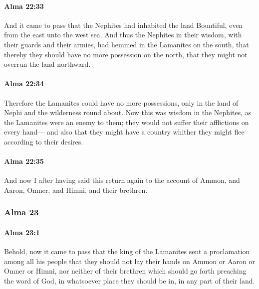 		\paragraph{Alma 22:33} %
			\label{ALMA-22-33}

			And it came to pass that the Nephites had inhabited the land Bountiful,
			even from the east unto the west sea.
			And thus the Nephites in their wisdom, with their guards and their armies,
			had hemmed in the Lamanites on the south,
			that thereby they should have no more possession on the north,
			that they might not overrun the land northward.

		\paragraph{Alma 22:34} %
			\label{ALMA-22-34}

			Therefore the Lamanites could have no more possessions,
			only in the land of Nephi and the wilderness round about.
			Now this was wisdom in the Nephites, as the Lamanites were an enemy to them;
			they would not suffer their afflictions on every hand---
			and also that they might have a country
			whither they might flee according to their desires.

		\paragraph{Alma 22:35} %
			\label{ALMA-22-35}

			And now I after having said this return again
			to the account of Ammon, and Aaron, Omner, and Himni, and their brethren.

	\subsubsection{Alma 23} %
		\label{ALMA-23}
		
		\paragraph{Alma 23:1} %
			\label{ALMA-23-1}

			Behold, now it came to pass that
			the king of the Lamanites sent a proclamation among all his people
			that they should not lay their hands on Ammon or Aaron or Omner or Himni,
			nor neither of their brethren which should go forth preaching the word of God,
			in whatsoever place they should be in, in any part of their land.

